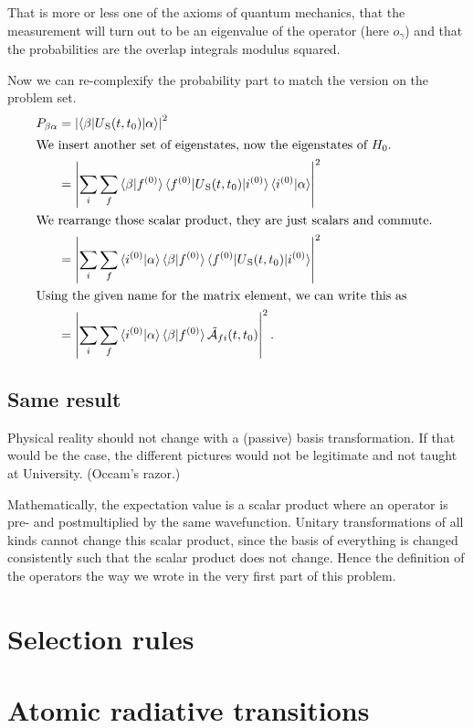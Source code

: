 \documentclass[11pt, english, fleqn, DIV=15, headinclude, BCOR=1.5cm]{scrartcl}
\begin{document}
That is more or less one of the axioms of quantum mechanics, that the
measurement will turn out to be an eigenvalue of the operator (here $o_\gamma$)
and that the probabilities are the overlap integrals modulus squared.

Now we can re-complexify the probability part to match the version on
the problem set.
\begin{align*}
    P_{\beta\alpha}
    &= \abs{\braket{\beta | U\SP(t, t_0)| \alpha}}^2 \\
    \intertext{%
        We insert another set of eigenstates, now the eigenstates of $H_0$.
    }
    &= \abs{\sum_i \sum_f \braket{\beta | f\0} \braket{f\0 | U\SP(t, t_0)| i\0}
    \braket{i\0 | \alpha}}^2 \\
    \intertext{%
        We rearrange those scalar product, they are just scalars and commute.
    }
    &= \abs{\sum_i \sum_f \braket{i\0 | \alpha} \braket{\beta | f\0}
    \braket{f\0 | U\SP(t, t_0)| i\0} }^2 \\
    \intertext{%
        Using the given name for the matrix element, we can write this as
    }
    &= \abs{\sum_i \sum_f \braket{i\0 | \alpha} \braket{\beta | f\0}
    \tilde{\mathcal A}_{fi}(t, t_0) }^2. \\
\end{align*}

\subsection{Same result}

Physical reality should not change with a (passive) basis transformation. If
that would be the case, the different pictures would not be legitimate and not
taught at University. (Occam's razor.)

Mathematically, the expectation value is a scalar product where an operator is
pre- and postmultiplied by the same wavefunction. Unitary transformations of
all kinds cannot change this scalar product, since the basis of everything is
changed consistently such that the scalar product does not change. Hence the
definition of the operators the way we wrote in the very first part of this
problem.

\section{Selection rules}

\section{Atomic radiative transitions}
\end{document}
